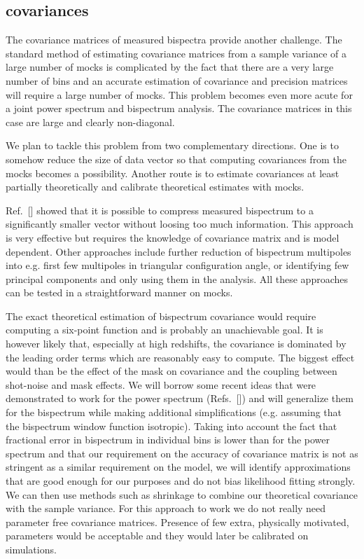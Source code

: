\subsection*{covariances}

The covariance matrices of measured bispectra provide another challenge. The
standard method of estimating covariance matrices from a sample variance of a
large number of mocks is complicated by the fact that there are a very large
number of bins and an accurate estimation of covariance and precision matrices
will require a large number of mocks. This problem becomes even more acute for
a joint power spectrum and bispectrum analysis. The covariance matrices in this
case are large and clearly non-diagonal.

We plan to tackle this problem from two complementary directions. One is to
somehow reduce the size of data vector so that computing covariances from the
mocks becomes a possibility. Another route is to estimate covariances at least
partially theoretically and calibrate theoretical estimates with mocks. 

Ref.~[] showed that it is possible to compress measured bispectrum to a
significantly smaller vector without loosing too much information. This
approach is very effective but requires the knowledge of covariance matrix and
is model dependent. Other approaches include further reduction of bispectrum
multipoles into e.g. first few multipoles in triangular configuration angle, or
identifying few principal components and only using them in the analysis. All
these approaches can be tested in a straightforward manner on mocks.

The exact theoretical estimation of bispectrum covariance would require
computing a six-point function and is probably an unachievable goal. It is
however likely that, especially at high redshifts, the covariance is dominated
by the leading order terms which are reasonably easy to compute. The biggest
effect would than be the effect of the mask on covariance and the coupling
between shot-noise and mask effects. We will borrow some recent ideas that were
demonstrated to work for the power spectrum (Refs.~[]) and will generalize them
for the bispectrum while making additional simplifications (e.g. assuming that
the bispectrum window function isotropic). Taking into account the fact that
fractional error in bispectrum in individual bins is lower than for the power
spectrum and that our requirement on the accuracy of covariance matrix is not
as stringent as a similar requirement on the model, we will identify
approximations that are good enough for our purposes and do not bias likelihood
fitting strongly. We can then use methods such as shrinkage to combine our
theoretical covariance with the sample variance. For this approach to work we
do not really need parameter free covariance matrices. Presence of few extra,
physically motivated, parameters would be acceptable and they would later be
calibrated on simulations.

